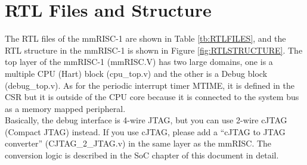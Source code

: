 \section{RTL Files and Structure}

The RTL files of the mmRISC-1 are shown in Table \ref{tb:RTLFILES}, and the RTL structure in the mmRISC-1 is shown in Figure \ref{fig:RTLSTRUCTURE}. The top layer of the mmRISC-1 (mmRISC.V) has two large domains, one is a multiple CPU (Hart) block (cpu\_top.v) and the other is a Debug block (debug\_top.v). As for the periodic interrupt timer MTIME, it is defined in the CSR but it is outside of the CPU core because it is connected to the system bus as a memory mapped peripheral. \\

Basically, the debug interface is 4-wire JTAG, but you can use 2-wire cJTAG (Compact JTAG) instead. If you use cJTAG, please add a “cJTAG to JTAG converter” (CJTAG\_2\_JTAG.v) in the same layer as the mmRISC. The conversion logic is described in the SoC chapter of this document in detail.


